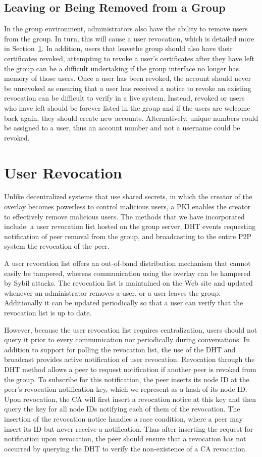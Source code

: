 \subsection{Leaving or Being Removed from a Group}
In the group environment, administrators also have the ability to remove users
from the group.  In turn, this will cause a user revocation, which is detailed
more in Section~\ref{revocation}.  In addition, users that leavethe group
should also have their certificates revoked, attempting to revoke a user's
certificates after they have left the group can be a difficult undertaking
if the group interface no longer has memory of those users.  Once a user has
been revoked, the account should never be unrevoked as ensuring that a user
has received a notice to revoke an existing revocation can be difficult to
verify in a live system.  Instead, revoked or users who have left should be
forever listed in the group and if the users are welcome back again, they
should create new accounts.  Alternatively, unique numbers could be assigned
to a user, thus an account number and not a username could be revoked.

\section{User Revocation}
\label{revocation}
Unlike decentralized systems that use shared secrets, in which the creator of
the overlay becomes powerless to control malicious users, a PKI enables the
creator to effectively remove malicious users.  The methods that we have
incorporated include:  a user revocation list hosted on the group server,
DHT events requesting notification of peer removal from the group, and
broadcasting to the entire P2P system the revocation of the peer.

A user revocation list offers an out-of-band distribution mechanism that cannot
easily be tampered, whereas communication using the overlay can be hampered
by Sybil attacks.  The revocation list is maintained on the Web site and updated
whenever an administrator removes a user, or a user leaves the group.
Additionally it can be updated periodically so that a user can verify that the
revocation list is up to date.

However, because the user revocation list requires centralization, users should
not query it prior to every communication nor periodically during conversations.
In addition to support for polling the revocation list, the use of the DHT and
broadcast provides active notification of user revocation.  Revocation through
the DHT method allows a peer to request notification if another peer is revoked
from the group.  To subscribe for this notification, the peer inserts its node
ID at the peer's revocation notification key, which we represent as a hash of
its node ID.  Upon revocation, the CA will first insert a revocation notice at
this key and then query the key for all node IDs notifying each of them of the
revocation.  The insertion of the revocation notice handles a race condition,
where a peer may insert its ID but never receive a notification.  Thus after
inserting the request for notification upon revocation, the peer should ensure
that a revocation has not occurred by querying the DHT to verify the
non-existence of a CA revocation.


